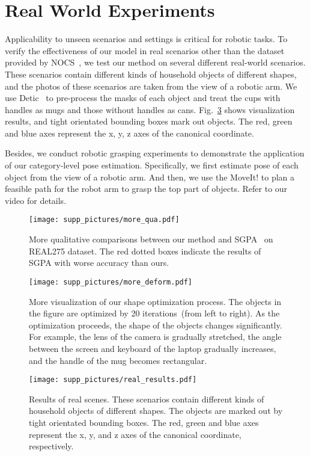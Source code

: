 \documentclass{article}
\begin{document}
\section{Real World Experiments}
\label{supp:real}
Applicability to unseen scenarios and settings is critical for robotic tasks. To verify the effectiveness of our model in real scenarios other than the dataset provided by NOCS~\cite{NOCS}, we test our method on several different real-world scenarios. These scenarios contain different kinds of household objects of different shapes, and the photos of these scenarios are taken from the view of a robotic arm. We use Detic~\cite{detic} to pre-process the masks of each object and treat the cups with handles as mugs and those without handles as cans.
Fig.~\ref{fig:real_world} shows visualization results, and tight orientated bounding boxes mark out objects. The red, green and blue axes represent the x, y, z axes of the canonical coordinate. 

Besides, we conduct robotic grasping experiments to demonstrate the application of our category-level pose estimation. Specifically, we first estimate pose of each object from the view of a robotic arm. And then, we use the MoveIt!\cite{chitta2012moveit} to plan a feasible path for the robot arm to grasp the top part of objects. Refer to our video for details.

 \setcounter{section}{6}
\begin{figure}
    \centering
    \texttt{[image: supp\_pictures/more\_qua.pdf]}
    \caption{More qualitative comparisons between our method and SGPA~\cite{SGPA} on REAL275 dataset. The red dotted boxes indicate the results of SGPA with worse accuracy than ours.}
    \label{fig:more_qualitative}
\end{figure}

\begin{figure}
    \centering
    \texttt{[image: supp\_pictures/more\_deform.pdf]}
    \caption{More visualization of our shape optimization process. The objects in the figure are optimized by 20 iterations~(from left to right). As the optimization proceeds, the shape of the objects changes significantly. For example, the lens of the camera is gradually stretched, the angle between the screen and keyboard of the laptop gradually increases, and the handle of the mug becomes rectangular.}
    \label{fig:more_deform}
\end{figure}


\begin{figure}
    \centering
    \texttt{[image: supp\_pictures/real\_results.pdf]}
    \caption{Results of real scenes. These scenarios contain different kinds of household objects of different shapes. The objects are marked out by tight orientated bounding boxes. The red, green and blue axes represent the x, y, and z axes of the canonical coordinate, respectively.}
    \label{fig:real_world}
\end{figure}
 
\end{document}
